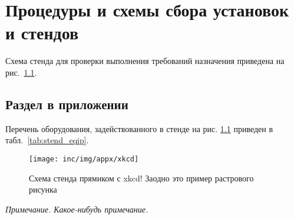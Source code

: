 

\chapter{Процедуры и схемы сбора установок и стендов}
\label{cha:appendix_schemes}


Схема стенда для проверки выполнения требований назначения приведена на рис.~\ref{fig:xkcd}. 

\section{Раздел в приложении}

Перечень оборудования, задействованного в стенде на рис. \ref{fig:xkcd} приведен в табл.~\ref{tab:stend_eqip}.
	
	\begin{figure}[H]
		\centering
		\texttt{[image: inc/img/appx/xkcd]}
		\caption{Схема стенда прямиком с xkcd! Заодно это пример растрового рисунка}
		\label{fig:xkcd}
	\end{figure}
	
\textit{Примечание. Какое-нибудь примечание.}
	
